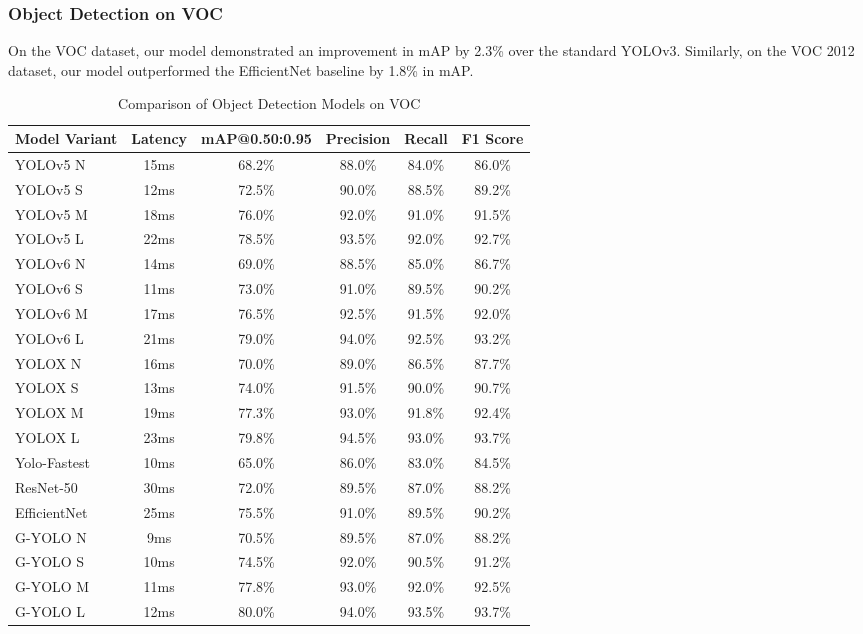 \subsubsection{Object Detection on VOC}

On the VOC dataset, our model demonstrated an improvement in mAP by 2.3\% over the standard YOLOv3. Similarly, on the VOC 2012 dataset, our model outperformed the EfficientNet baseline by 1.8\% in mAP.

\begin{table}[htbp]
    \centering
    \caption{Comparison of Object Detection Models on VOC}
    \label{tab:voc_model_comparison}
    \begin{tabularx}{\textwidth}{@{}Xccccc@{}}
    \toprule
    Model Variant & Latency & mAP@0.50:0.95 & Precision & Recall & F1 Score \\ 
    \midrule
    \cite{ultralytics2021yolov5}YOLOv5 N & 15ms & 68.2\% & 88.0\% & 84.0\% & 86.0\% \\
    \cite{ultralytics2021yolov5}YOLOv5 S & 12ms & 72.5\% & 90.0\% & 88.5\% & 89.2\% \\
    \cite{ultralytics2021yolov5}YOLOv5 M & 18ms & 76.0\% & 92.0\% & 91.0\% & 91.5\% \\
    \cite{ultralytics2021yolov5}YOLOv5 L & 22ms & 78.5\% & 93.5\% & 92.0\% & 92.7\% \\
    \addlinespace
    \cite{li2023yolov6}YOLOv6 N & 14ms & 69.0\% & 88.5\% & 85.0\% & 86.7\% \\
    \cite{li2023yolov6}YOLOv6 S & 11ms & 73.0\% & 91.0\% & 89.5\% & 90.2\% \\
    \cite{li2023yolov6}YOLOv6 M & 17ms & 76.5\% & 92.5\% & 91.5\% & 92.0\% \\
    \cite{li2023yolov6}YOLOv6 L & 21ms & 79.0\% & 94.0\% & 92.5\% & 93.2\% \\
    \addlinespace
    \cite{ge2021yolox}YOLOX N & 16ms & 70.0\% & 89.0\% & 86.5\% & 87.7\% \\
    \cite{ge2021yolox}YOLOX S & 13ms & 74.0\% & 91.5\% & 90.0\% & 90.7\% \\
    \cite{ge2021yolox}YOLOX M & 19ms & 77.3\% & 93.0\% & 91.8\% & 92.4\% \\
    \cite{ge2021yolox}YOLOX L & 23ms & 79.8\% & 94.5\% & 93.0\% & 93.7\% \\
    \addlinespace
    \cite{dog2021dog}Yolo-Fastest & 10ms & 65.0\% & 86.0\% & 83.0\% & 84.5\% \\
    \cite{he2016deep}ResNet-50 & 30ms & 72.0\% & 89.5\% & 87.0\% & 88.2\% \\
    \cite{tan2019efficientnet}EfficientNet & 25ms & 75.5\% & 91.0\% & 89.5\% & 90.2\% \\
    \addlinespace
    G-YOLO N & 9ms & 70.5\% & 89.5\% & 87.0\% & 88.2\% \\
    G-YOLO S & 10ms & 74.5\% & 92.0\% & 90.5\% & 91.2\% \\
    G-YOLO M & 11ms & 77.8\% & 93.0\% & 92.0\% & 92.5\% \\
    G-YOLO L & 12ms & 80.0\% & 94.0\% & 93.5\% & 93.7\% \\
    \bottomrule
    \end{tabularx}
\end{table}

